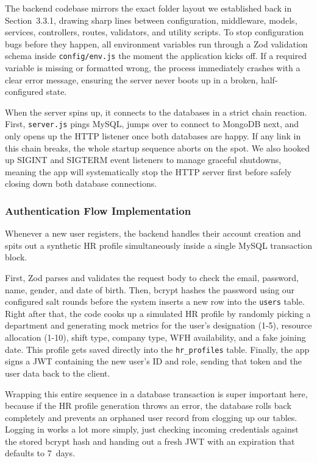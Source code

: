 \documentclass[12pt,a4paper]{article}
\begin{document}
The backend codebase mirrors the exact folder layout we established back in Section~3.3.1, drawing sharp lines between configuration, middleware, models, services, controllers, routes, validators, and utility scripts. To stop configuration bugs before they happen, all environment variables run through a Zod validation schema inside \texttt{config/env.js} the moment the application kicks off. If a required variable is missing or formatted wrong, the process immediately crashes with a clear error message, ensuring the server never boots up in a broken, half-configured state.

When the server spins up, it connects to the databases in a strict chain reaction. First, \texttt{server.js} pings MySQL, jumps over to connect to MongoDB next, and only opens up the HTTP listener once both databases are happy. If any link in this chain breaks, the whole startup sequence aborts on the spot. We also hooked up SIGINT and SIGTERM event listeners to manage graceful shutdowns, meaning the app will systematically stop the HTTP server first before safely closing down both database connections.

\subsubsection{Authentication Flow Implementation}

Whenever a new user registers, the backend handles their account creation and spits out a synthetic HR profile simultaneously inside a single MySQL transaction block.

First, Zod parses and validates the request body to check the email, password, name, gender, and date of birth. Then, bcrypt hashes the password using our configured salt rounds before the system inserts a new row into the \texttt{users} table. Right after that, the code cooks up a simulated HR profile by randomly picking a department and generating mock metrics for the user's designation (1-5), resource allocation (1-10), shift type, company type, WFH availability, and a fake joining date. This profile gets saved directly into the \texttt{hr\_profiles} table. Finally, the app signs a JWT containing the new user's ID and role, sending that token and the user data back to the client.

Wrapping this entire sequence in a database transaction is super important here, because if the HR profile generation throws an error, the database rolls back completely and prevents an orphaned user record from clogging up our tables. Logging in works a lot more simply, just checking incoming credentials against the stored bcrypt hash and handing out a fresh JWT with an expiration that defaults to 7~days.
\end{document}
